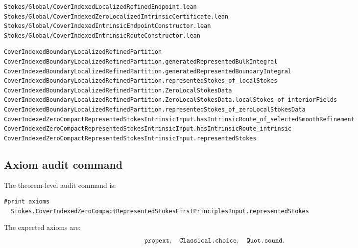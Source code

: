 \begin{lstlisting}[basicstyle=\ttfamily\footnotesize]
Stokes/Global/CoverIndexedLocalizedRefinedEndpoint.lean
Stokes/Global/CoverIndexedZeroLocalizedIntrinsicCertificate.lean
Stokes/Global/CoverIndexedIntrinsicEndpointConstructor.lean
Stokes/Global/CoverIndexedIntrinsicRouteConstructor.lean
\end{lstlisting}

\begin{lstlisting}[basicstyle=\ttfamily\footnotesize]
CoverIndexedBoundaryLocalizedRefinedPartition
CoverIndexedBoundaryLocalizedRefinedPartition.generatedRepresentedBulkIntegral
CoverIndexedBoundaryLocalizedRefinedPartition.generatedRepresentedBoundaryIntegral
CoverIndexedBoundaryLocalizedRefinedPartition.representedStokes_of_localStokes
CoverIndexedBoundaryLocalizedRefinedPartition.ZeroLocalStokesData
CoverIndexedBoundaryLocalizedRefinedPartition.ZeroLocalStokesData.localStokes_of_interiorFields
CoverIndexedBoundaryLocalizedRefinedPartition.representedStokes_of_zeroLocalStokesData
CoverIndexedZeroCompactRepresentedStokesIntrinsicInput.hasIntrinsicRoute_of_selectedSmoothRefinement
CoverIndexedZeroCompactRepresentedStokesIntrinsicInput.hasIntrinsicRoute_intrinsic
CoverIndexedZeroCompactRepresentedStokesIntrinsicInput.representedStokes
\end{lstlisting}

\subsection{Axiom audit command}

The theorem-level audit command is:
\begin{lstlisting}[language=Lean]
#print axioms
  Stokes.CoverIndexedZeroCompactRepresentedStokesFirstPrinciplesInput.representedStokes
\end{lstlisting}
The expected axioms are:
\[
\code{propext},\quad \code{Classical.choice},\quad \code{Quot.sound}.
\]
